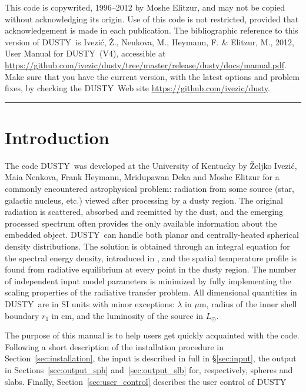 \documentclass[11pt]{article}
\def\D    {{\sf DUSTY}}
\def\mic    {\hbox{$\mu$m}}
\def\Lo     {\hbox{$L_{\odot}$}}
\def\Ivezic {Ivezi\'c}
\begin{document}
\newpage

\thispagestyle{empty}

This code is copywrited, 1996--2012 by Moshe Elitzur, and may not be
copied without acknowledging its origin. Use of this code is not
restricted, provided that acknowledgement is made in each publication.
The bibliographic reference to this version of \D\ is \Ivezic, \v Z.,
Nenkova, M., Heymann, F. \& Elitzur, M., 2012, User Manual for \D ~(V4),
accessible at
\url{https://github.com/ivezic/dusty/tree/master/release/dusty/docs/manual.pdf}. 
Make sure that you have the current version, with the latest options and 
problem fixes, by checking the \D\ Web site \url{https://github.com/ivezic/dusty}. 

\newpage

 \setcounter{page}{1}

{\large\tableofcontents}

\bigskip \bigskip \hrule \bigskip \bigskip


\section{Introduction}
\label{sec:Introduction}

The code \D\ was developed at the University of Kentucky by \v Zeljko
\Ivezic, Maia Nenkova, Frank Heymann, Mridupawan Deka and Moshe
Elitzur for a commonly encountered astrophysical problem: radiation
from some source (star, galactic nucleus, etc.) viewed after
processing by a dusty region. The original radiation is scattered,
absorbed and reemitted by the dust, and the emerging processed
spectrum often provides the only available information about the
embedded object. \D\ can handle both planar and centrally-heated
spherical density distributions.  The solution is obtained through an
integral equation for the spectral energy density, introduced in
\cite{IE97}, and the spatial temperature profile is found from
radiative equilibrium at every point in the dusty region. The number
of independent input model parameters is minimized by fully
implementing the scaling properties of the radiative transfer problem.
All dimensional quantities in \D\ are in SI units with minor
exceptions: $\lambda$ in \mic, radius of the inner shell boundary
$r_1$ in cm, and the luminosity of the source in \Lo.

The purpose of this manual is to help users get quickly acquainted
with the code. Following a short description of the installation
procedure in Section~\ref{sec:installation}, the input is described in
full in \S\ref{sec:input}, the output in Sections~\ref{sec:output_sph}
and~\ref{sec:output_slb} for, respectively, spheres and
slabs. Finally, Section~\ref{sec:user_control} describes the user
control of \D
\end{document}
